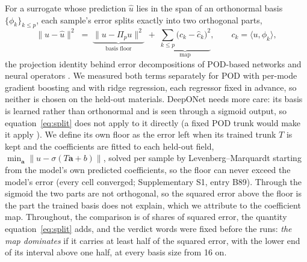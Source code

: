 \documentclass[10pt,a4paper]{article}
\begin{document}
For a surrogate whose prediction \(\hat u\) lies in the span of an orthonormal basis
\(\{\phi_k\}_{k\le p}\), each sample's error splits exactly into two orthogonal parts,
\begin{equation}
\lVert u - \hat u \rVert^2 \;=\; \underbrace{\lVert u - \Pi_p u \rVert^2}_{\text{basis floor}}
\;+\; \underbrace{\textstyle\sum_{k \le p} \bigl(c_k - \hat c_k\bigr)^2}_{\text{map}},
\qquad c_k = \langle u, \phi_k \rangle ,
\label{eq:split}
\end{equation}
the projection identity behind error decompositions of POD-based networks and neural
operators \cite{bhattacharya2021model,lanthaler2022error,kovachki2024operator,brivio2024error,wang2025rbdeeponet}. We measured both terms
separately for POD with per-mode gradient boosting and with ridge regression, each
regressor fixed in advance, so neither is chosen on the held-out materials. DeepONet needs
more care: its basis is learned rather than orthonormal and is seen through a sigmoid
output, so equation~\eqref{eq:split} does not apply to it directly (a fixed POD trunk would
make it apply \cite{lu2022comprehensive}). We define its own floor as the error left when its
trained trunk \(T\) is kept and the coefficients are fitted to each held-out field,
\(\min_{\mathbf a}\lVert u - \sigma(T\mathbf a + b)\rVert\), solved per sample by
Levenberg--Marquardt starting from the model's own predicted coefficients, so the floor can
never exceed the model's error (every cell converged; Supplementary S1, entry B89). Through the
sigmoid the two parts are not orthogonal, so the squared error above the floor is the part
the trained basis does not explain, which we attribute to the coefficient map.
Throughout, the comparison is of shares of squared
error, the quantity equation~\eqref{eq:split} adds, and the verdict words were fixed
before the runs: \emph{the map dominates} if it carries at least half of the squared error,
with the lower end of its interval above one half, at every basis size from 16 on.
\end{document}
